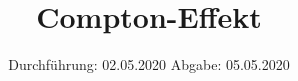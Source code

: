 

\subject{V603}
\title{Compton-Effekt}
\date{%
  Durchführung: 02.05.2020
  \hspace{3em}
  Abgabe: 05.05.2020
}



\maketitle
\thispagestyle{empty}
\tableofcontents
\newpage








\printbibliography{}


